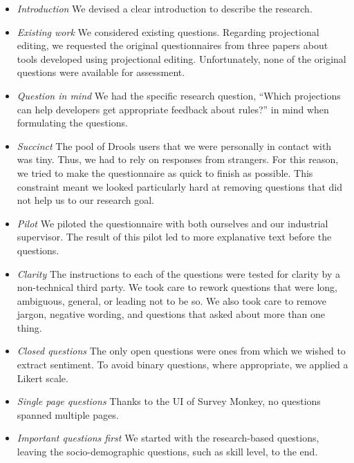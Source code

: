 \begin{itemize}    
    \setlength\itemsep{0em}
    \item \emph{Introduction} 
        We devised a clear introduction to describe the research.
    \item \emph{Existing work} 
        We considered existing questions.
        Regarding projectional editing, we requested the original questionnaires from three papers\cite{meacham2020adaptivevle_SLR,berger2016efficiency, voelter2014towards} about tools developed using projectional editing.
        Unfortunately, none of the original questions were available for assessment.
    \item \emph{Question in mind} 
        We had the specific research question, ``Which projections can help developers get appropriate feedback about rules?'' in mind when formulating the questions.
    \item \emph{Succinct} 
        The pool of Drools users that we were personally in contact with was tiny.
        Thus, we had to rely on responses from strangers.
        For this reason, we tried to make the questionnaire as quick to finish as possible.
        This constraint meant we looked particularly hard at removing questions that did not help us to our research goal.
    \item \emph{Pilot} 
        We piloted the questionnaire with both ourselves and our industrial supervisor. 
        The result of this pilot led to more explanative text before the questions.
    \item \emph{Clarity} 
        The instructions to each of the questions were tested for clarity by a non-technical third party.
        We took care to rework questions that were long, ambiguous, general, or leading not to be so.
        We also took care to remove jargon, negative wording, and questions that asked about more than one thing.
    \item \emph{Closed questions} 
        The only open questions were ones from which we wished to extract sentiment.
        To avoid binary questions, where appropriate, we applied a Likert scale\cite{likert1932technique}.
    \item \emph{Single page questions} 
        Thanks to the UI of Survey Monkey, no questions spanned multiple pages.
    \item \emph{Important questions first} 
        We started with the research-based questions, leaving the socio-demographic questions, such as skill level, to the end.
\end{itemize}

